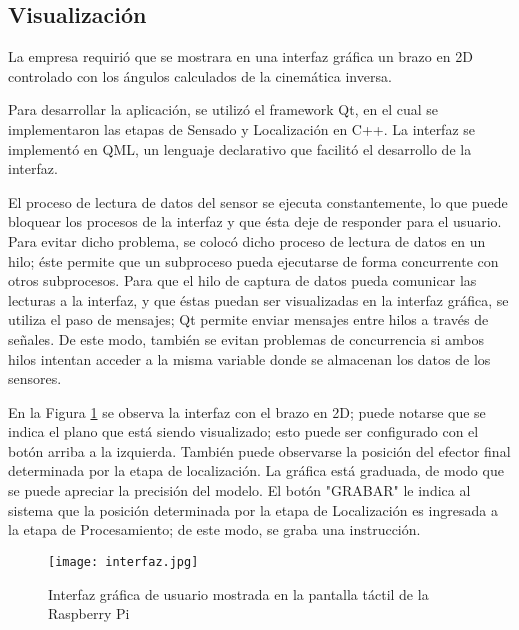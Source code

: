 \subsection{Visualización}

La empresa requirió que se mostrara en una interfaz gráfica un brazo en 2D controlado con los ángulos calculados de la cinemática inversa.

Para desarrollar la aplicación, se utilizó el framework Qt, en el cual se implementaron las etapas de Sensado y Localización en C++. La interfaz se implementó en QML, un lenguaje declarativo que facilitó el desarrollo de la interfaz.

El proceso de lectura de datos del sensor se ejecuta constantemente, lo que puede bloquear los procesos de la interfaz y que ésta deje de responder para el usuario. Para evitar dicho problema, se colocó dicho proceso de lectura de datos en un hilo; éste permite que un subproceso pueda ejecutarse de forma concurrente con otros subprocesos. Para que el hilo de captura de datos pueda comunicar las lecturas a la interfaz, y que éstas puedan ser visualizadas en la interfaz gráfica, se utiliza el paso de mensajes; Qt permite enviar mensajes entre hilos a través de señales. De este modo, también se evitan problemas de concurrencia si ambos hilos intentan acceder a la misma variable donde se almacenan los datos de los sensores.

En la Figura \ref{fig:interfaz} se observa la interfaz con el brazo en 2D; puede notarse que se indica el plano que está siendo visualizado; esto puede ser configurado con el botón arriba a la izquierda. También puede observarse la posición del efector final determinada por la etapa de localización. La gráfica está graduada, de modo que se puede apreciar la precisión del modelo. El botón "GRABAR" le indica al sistema que la posición determinada por la etapa de Localización es ingresada a la etapa de Procesamiento; de este modo, se graba una instrucción.

\begin{figure}[htb]
	\centering
	\texttt{[image: interfaz.jpg]}
	\caption{Interfaz gráfica de usuario mostrada en la pantalla táctil de la Raspberry Pi}
	\label{fig:interfaz}
\end{figure}